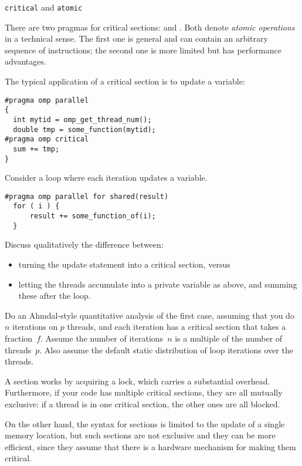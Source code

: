  {\texttt{critical} and \texttt{atomic}}
\label{sec:critical}

There are two pragmas for critical sections:  and .
Both denote \emph{atomic operations}
in a technical sense.
The first one is general and can contain an arbitrary sequence of instructions;
the second one is more limited but has performance advantages.

The typical application of a critical section is to update a variable:
\begin{lstlisting}
#pragma omp parallel
{
  int mytid = omp_get_thread_num();
  double tmp = some_function(mytid);
#pragma omp critical
  sum += tmp;
}
\end{lstlisting}

\begin{exercise}
  Consider  a loop where each iteration updates a variable.
\begin{lstlisting}
#pragma omp parallel for shared(result)
  for ( i ) {
      result += some_function_of(i);
  }
\end{lstlisting}
  Discuss qualitatively
  the difference between:
  \begin{itemize}
  \item  turning the update statement into a critical section, versus
  \item letting the threads accumulate into a private variable  as above,
    and summing these after the loop.
  \end{itemize}  
  Do an Ahmdal-style quantitative analysis of the first case, assuming
  that you do $n$ iterations on $p$ threads, and each iteration has a
  critical section that takes a fraction~$f$.  Assume the number of
  iterations~$n$ is a multiple of the number of threads~$p$. Also
  assume the default static distribution of loop iterations over the
  threads.
\end{exercise}

A  section works by acquiring a lock, which carries a substantial overhead.
Furthermore, if your code has multiple critical sections, they are all mutually exclusive:
if a thread is in one critical section, the other ones are all blocked.

On the other hand, the syntax for  sections is limited to the update
of a single memory location, but such sections
are not exclusive and they can be more efficient, since they assume that there is a hardware
mechanism for making them critical.

